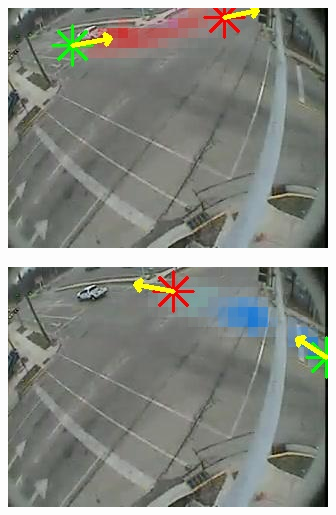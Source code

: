 \begin{figure}
\begin{subfigure}{0.32\linewidth}
            \includegraphics[width=\linewidth]{./img/scene_learning/res/intersection_4/intersection_4-8.jpg}
        \end{subfigure}
        \begin{subfigure}{0.32\linewidth}
            \includegraphics[width=\linewidth]{./img/scene_learning/res/intersection_4/intersection_4-9.jpg}
        \end{subfigure}
        \begin{subfigure}{0.32\linewidth}

\end{subfigure}
\end{figure}

